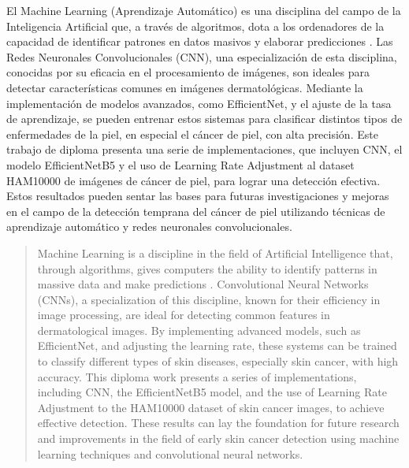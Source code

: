 \begin{resumen}	
	El Machine Learning (Aprendizaje Automático) es una disciplina del campo de la Inteligencia Artificial que, a través de algoritmos, dota a los ordenadores de la capacidad de identificar patrones en datos masivos y elaborar predicciones . Las Redes Neuronales Convolucionales (CNN), una especialización de esta disciplina, conocidas por su eficacia en el procesamiento de imágenes, son ideales para detectar características comunes en imágenes dermatológicas. Mediante la implementación de modelos avanzados, como EfficientNet, y el ajuste de la tasa de aprendizaje, se pueden entrenar estos sistemas para clasificar distintos tipos de enfermedades de la piel, en especial el cáncer de piel, con alta precisión. Este trabajo de diploma presenta una serie de implementaciones, que incluyen CNN, el modelo EfficientNetB5 y el uso de Learning Rate Adjustment al dataset HAM10000 de imágenes de cáncer de piel, para lograr una detección efectiva. Estos resultados pueden sentar las bases para futuras investigaciones y mejoras en el campo de la detección temprana del cáncer de piel utilizando técnicas de aprendizaje automático y redes neuronales convolucionales.
\end{resumen}

\begin{abstract}
	Machine Learning is a discipline in the field of Artificial Intelligence that, through algorithms, gives computers the ability to identify patterns in massive data and make predictions . Convolutional Neural Networks (CNNs), a specialization of this discipline, known for their efficiency in image processing, are ideal for detecting common features in dermatological images. By implementing advanced models, such as EfficientNet, and adjusting the learning rate, these systems can be trained to classify different types of skin diseases, especially skin cancer, with high accuracy. This diploma work presents a series of implementations, including CNN, the EfficientNetB5 model, and the use of Learning Rate Adjustment to the HAM10000 dataset of skin cancer images, to achieve effective detection. These results can lay the foundation for future research and improvements in the field of early skin cancer detection using machine learning techniques and convolutional neural networks.
\end{abstract}